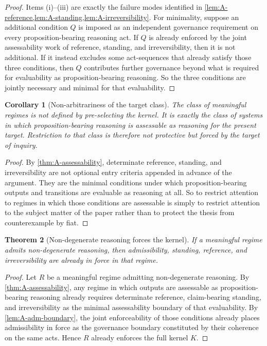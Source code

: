 \documentclass[11pt]{article}
\theoremstyle{plain}
\newtheorem{theorem}{Theorem}[section]
\newtheorem{corollary}[theorem]{Corollary}
\theoremstyle{definition}
\begin{document}
\begin{proof}
Items (i)--(iii) are exactly the failure modes identified in \cref{lem:A-reference,lem:A-standing,lem:A-irreversibility}. For minimality, suppose an additional condition $Q$ is imposed as an independent governance requirement on every proposition-bearing reasoning act. If $Q$ is already enforced by the joint assessability work of reference, standing, and irreversibility, then it is not additional. If it instead excludes some act-sequences that already satisfy those three conditions, then $Q$ contributes further governance beyond what is required for evaluability as proposition-bearing reasoning. So the three conditions are jointly necessary and minimal for that evaluability.
\end{proof}

\begin{corollary}[Non-arbitrariness of the target class]
\label{cor:A-target-class}
The class of meaningful regimes is not defined by pre-selecting the kernel. It is exactly the class of systems in which proposition-bearing reasoning is assessable as reasoning for the present target. Restriction to that class is therefore not protective but forced by the target of inquiry.
\end{corollary}

\begin{proof}
By \cref{thm:A-assessability}, determinate reference, standing, and irreversibility are not optional entry criteria appended in advance of the argument. They are the minimal conditions under which proposition-bearing outputs and transitions are evaluable as reasoning at all. So to restrict attention to regimes in which those conditions are assessable is simply to restrict attention to the subject matter of the paper rather than to protect the thesis from counterexample by fiat.
\end{proof}

\begin{theorem}[Non-degenerate reasoning forces the kernel]
\label{thm:A-kernel}
If a meaningful regime admits non-degenerate reasoning, then admissibility, standing, reference, and irreversibility are already in force in that regime.
\end{theorem}

\begin{proof}
Let $R$ be a meaningful regime admitting non-degenerate reasoning. By \cref{thm:A-assessability}, any regime in which outputs are assessable as proposition-bearing reasoning already requires determinate reference, claim-bearing standing, and irreversibility as the minimal assessability boundary of that evaluability. By \cref{lem:A-adm-boundary}, the joint enforceability of those conditions already places admissibility in force as the governance boundary constituted by their coherence on the same acts. Hence $R$ already enforces the full kernel $K$.
\end{proof}
\end{document}
